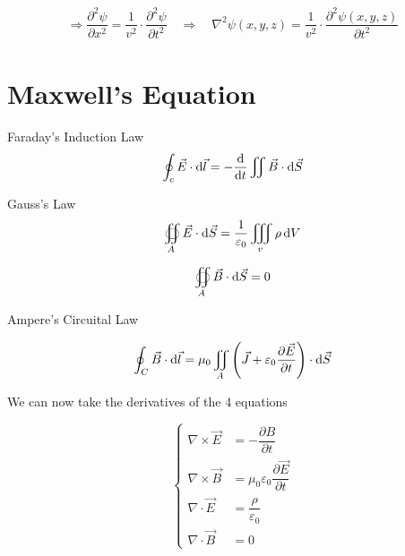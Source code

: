 \begin{equation*}
  \begin{aligned}
    \Rightarrow \dfrac{\partial^2 \psi}{\partial x^2} = \dfrac{1}{v^2} \cdot \dfrac{\partial^2 \psi}{\partial t^2}   
    \quad \Rightarrow \quad
    \nabla^2 \psi \left( x,y,z \right) = \dfrac{1}{v^2} \cdot \dfrac{\partial^2 \psi \left( x,y,z \right)}{\partial t^2}  
  \end{aligned}
\end{equation*}



\section{Maxwell's Equation}

Faraday's Induction Law
\begin{equation*}
  \oint_{c} \vec{E} \cdot \mathop{}\!\mathrm{d} \vec{l} = - \dfrac{\mathop{}\!\mathrm{d}}{\mathop{}\!\mathrm{d} t} \iint \vec{B} \cdot \mathop{}\!\mathrm{d} \vec{S}
\end{equation*}

Gauss's Law
\begin{equation*}
  \oiint_{A} \vec{E} \cdot \mathop{}\!\mathrm{d} \vec{S} = \dfrac{1}{\varepsilon_{0}} \iiint_{v} \rho \mathop{}\!\mathrm{d} V 
\end{equation*}

\begin{equation*}
  \oiint_{A} \vec{B} \cdot \mathop{}\!\mathrm{d} \vec{S} = 0
\end{equation*}

Ampere's Circuital Law

\begin{equation*}
  \oint_{C} \vec{B} \cdot \mathop{}\!\mathrm{d} \vec{l} = \mu_{0} \iint_{A} \left( \vec{J} + \varepsilon_{0} \dfrac{\partial \vec{E}}{\partial t}  \right) \cdot \mathop{}\!\mathrm{d} \vec{S}
\end{equation*}

We can now take the derivatives of the 4 equations

\begin{equation*}
  \left\{
  \begin{aligned}
    \nabla \times \vec{E} &= - \dfrac{\partial B}{\partial t} \\
    \nabla \times \vec{B} &= \mu_{0} \varepsilon_{0} \dfrac{\partial \vec{E}}{\partial t}  \\
    \nabla \cdot \vec{E} &= \dfrac{\rho}{\varepsilon_{0}} \\
    \nabla \cdot \vec{B} &= 0
  \end{aligned}
  \right.
\end{equation*}

